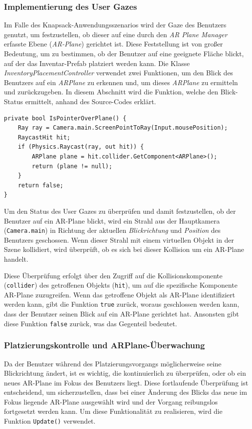 \begin{itemize}
\subsubsection{Implementierung des User Gazes}
Im Falle des Knapsack-Anwendungsszenarios wird der Gaze des Benutzers genutzt, um festzustellen, ob dieser auf eine durch
den \textit{AR Plane Manager} erfasste Ebene (\textit{AR-Plane}) gerichtet ist. Diese Feststellung ist von großer Bedeutung,
um zu bestimmen, ob der Benutzer auf eine geeignete Fläche blickt, auf der das Inventar-Prefab platziert werden kann.
Die Klasse \textit{InventoryPlacementController} verwendet zwei Funktionen, um den Blick des Benutzers auf ein \textit{ARPlane}
zu erkennen und, um dieses \textit{ARPlane} zu ermitteln und zurückzugeben. In diesem Abschnitt wird die Funktion, welche
den Blick-Status ermittelt, anhand des Source-Codes erklärt.
\begin{lstlisting}[caption={Funktion zur Überprüfung des User Gazes}, label=code:isPOP]
private bool IsPointerOverPlane() {
    Ray ray = Camera.main.ScreenPointToRay(Input.mousePosition);
    RaycastHit hit;
    if (Physics.Raycast(ray, out hit)) {
        ARPlane plane = hit.collider.GetComponent<ARPlane>();
        return (plane != null);
    }
    return false;
}
\end{lstlisting}
Um den Status des User Gazes zu überprüfen und damit festzustellen, ob der Benutzer auf ein AR-Plane blickt, wird ein
Strahl aus der Hauptkamera (\texttt{Camera.main}) in Richtung der aktuellen \textit{Blickrichtung} und \textit{Position}
des Benutzers geschossen. Wenn dieser Strahl mit einem virtuellen Objekt in der Szene kollidiert, wird überprüft, ob es
sich bei dieser Kollision um ein AR-Plane handelt.

Diese Überprüfung erfolgt über den Zugriff auf die Kollisionskomponente (\texttt{collider}) des getroffenen Objekts
(\texttt{hit}), um auf die spezifische Komponente AR-Plane zuzugreifen. Wenn das getroffene Objekt als AR-Plane identifiziert
werden kann, gibt die Funktion \texttt{true} zurück, woraus geschlossen werden kann, dass der Benutzer seinen Blick auf
ein AR-Plane gerichtet hat. Ansonsten gibt diese Funktion \texttt{false} zurück, was das Gegenteil bedeutet.

\subsubsection{Platzierungskontrolle und ARPlane-Überwachung}
Da der Benutzer während des Platzierungsvorgangs möglicherweise seine Blickrichtung ändert, ist es wichtig, die kontinuierlich
zu überprüfen, oder ob ein neues AR-Plane im Fokus des Benutzers liegt. Diese fortlaufende Überprüfung ist entscheidend,
um sicherzustellen, dass bei einer Änderung des Blicks das neue im Fokus liegende AR-Plane ausgewählt wird und der Vorgang
reibungslos fortgesetzt werden kann. Um diese Funktionalität zu realisieren, wird die Funktion \texttt{Update()} verwendet.


\end{itemize}
